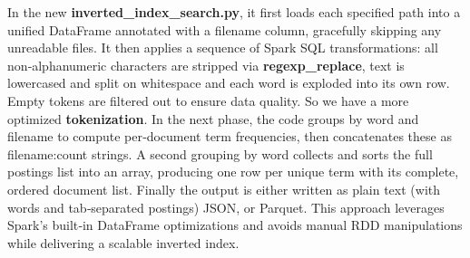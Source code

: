 In the new \textbf{inverted\_index\_search.py}, it first loads each specified path into a unified DataFrame annotated with a filename column, gracefully skipping any unreadable files. It then applies a sequence of Spark SQL transformations: all non‐alphanumeric characters are stripped via \textbf{regexp\_replace}, text is lowercased and split on whitespace and each word is exploded into its own row. Empty tokens are filtered out to ensure data quality. So we have a more optimized \textbf{tokenization}. In the next phase, the code groups by word and filename to compute per‐document term frequencies, then concatenates these as filename:count strings. A second grouping by word collects and sorts the full postings list into an array, producing one row per unique term with its complete, ordered document list. Finally the output is either written as plain text (with words and tab‐separated postings) JSON, or Parquet. This approach leverages Spark’s built‐in DataFrame optimizations and avoids manual RDD manipulations while delivering a scalable inverted index. 




